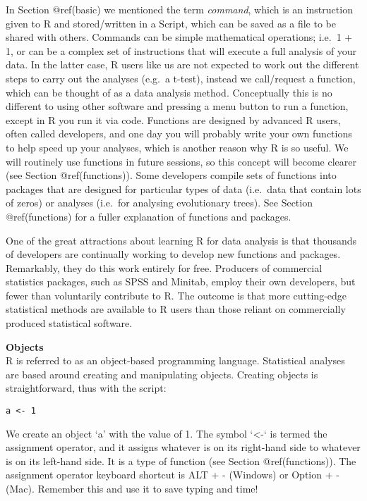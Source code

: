 \documentclass[
]{book}
\begin{document}
In Section @ref(basic) we mentioned the term \emph{command}, which is an
instruction given to R and stored/written in a Script, which can be
saved as a file to be shared with others. Commands can be simple
mathematical operations; i.e.~1 + 1, or can be a complex set of
instructions that will execute a full analysis of your data. In the
latter case, R users like us are not expected to work out the different
steps to carry out the analyses (e.g.~a t-test), instead we call/request
a function, which can be thought of as a data analysis method.
Conceptually this is no different to using other software and pressing a
menu button to run a function, except in R you run it via code.
Functions are designed by advanced R users, often called developers, and
one day you will probably write your own functions to help speed up your
analyses, which is another reason why R is so useful. We will routinely
use functions in future sessions, so this concept will become clearer
(see Section @ref(functions)). Some developers compile sets of functions
into packages that are designed for particular types of data (i.e.~data
that contain lots of zeros) or analyses (i.e.~for analysing evolutionary
trees). See Section @ref(functions) for a fuller explanation of
functions and packages.

One of the great attractions about learning R for data analysis is that
thousands of developers are continually working to develop new functions
and packages. Remarkably, they do this work entirely for free. Producers
of commercial statistics packages, such as SPSS and Minitab, employ
their own developers, but fewer than voluntarily contribute to R. The
outcome is that more cutting-edge statistical methods are available to R
users than those reliant on commercially produced statistical software.

\textbf{Objects}\\
R is referred to as an object-based programming language. Statistical
analyses are based around creating and manipulating objects. Creating
objects is straightforward, thus with the script:

\texttt{a\ \textless{}-\ 1}

We create an object `a' with the value of 1. The symbol `\textless-` is
termed the assignment operator, and it assigns whatever is on its
right-hand side to whatever is on its left-hand side. It is a type of
function (see Section @ref(functions)). The assignment operator keyboard
shortcut is ALT + - (Windows) or Option + - (Mac). Remember this and use
it to save typing and time!
\end{document}
